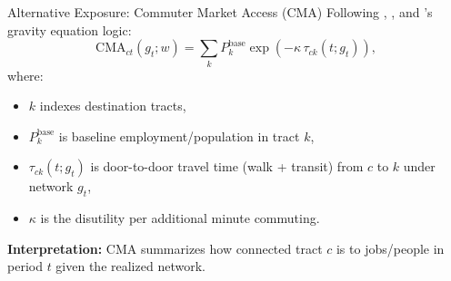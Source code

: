 \documentclass{beamer}
\begin{document}




\begin{frame}{Alternative Exposure: Commuter Market Access (CMA)}
\small
Following \citeauthor{eaton_technology_2002}, \citeauthor{donaldson_railroads_2016}, and \citeauthor{tsivanidis_evaluating_2022}'s gravity equation logic:
\[
\text{CMA}_{ct}(g_t; w) = \sum_k P_k^{\text{base}} \exp(-\kappa \, \tau_{ck}(t; g_t)),
\]
where:
\begin{itemize}
    \item $k$ indexes destination tracts,
    \item $P_k^{\text{base}}$ is baseline employment/population in tract $k$,
    \item $\tau_{ck}(t; g_t)$ is door-to-door travel time (walk + transit) from $c$ to $k$ under network $g_t$,
    \item $\kappa$ is the disutility per additional minute commuting.
\end{itemize}

\medskip
\textbf{Interpretation:} CMA summarizes how connected tract $c$ is to jobs/people in period $t$ given the realized network.
\end{frame}
\end{document}
